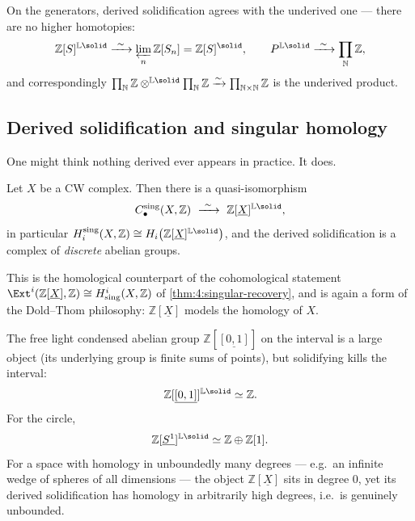 On the generators, derived solidification agrees with the underived one --- there
are no higher homotopies:
\begin{equation*}
\mathbb{Z}[S]^{\mathbb{L}\solid}\xrightarrow{\ \sim\ }\varprojlim_{n}\mathbb{Z}[S_{n}]
=\mathbb{Z}[S]^{\solid},\qquad
P^{\mathbb{L}\solid}\xrightarrow{\ \sim\ }\prod_{\mathbb{N}}\mathbb{Z},
\end{equation*}
and correspondingly
$\prod_{\mathbb{N}}\mathbb{Z}\otimes^{\mathbb{L}\solid}\prod_{\mathbb{N}}\mathbb{Z}
\xrightarrow{\sim}\prod_{\mathbb{N}\times\mathbb{N}}\mathbb{Z}$ is the underived
product.

\subsection{Derived solidification and singular homology}

One might think nothing derived ever appears in practice. It does.

\begin{proposition}
\label{prop:6:singular-homology}
Let $X$ be a CW complex. Then there is a quasi-isomorphism
\begin{equation*}
C^{\mathrm{sing}}_{\bullet}(X,\mathbb{Z})\ \xrightarrow{\ \sim\ }\ \mathbb{Z}[\underline{X}]^{\mathbb{L}\solid},
\end{equation*}
in particular
$H_{i}^{\mathrm{sing}}(X,\mathbb{Z})\cong H_{i}\bigl(\mathbb{Z}[\underline{X}]^{\mathbb{L}\solid}\bigr)$,
and the derived solidification is a complex of \emph{discrete} abelian groups.
\end{proposition}

This is the homological counterpart of the cohomological statement
$\Ext^{i}(\mathbb{Z}[\underline{X}],\mathbb{Z})\cong H^{i}_{\mathrm{sing}}(X,\mathbb{Z})$
of \cref{thm:4:singular-recovery}, and is again a form of the Dold--Thom
philosophy: $\mathbb{Z}[\underline{X}]$ models the homology of $X$.

\begin{example}
\label{ex:6:solid-of-spaces}
The free light condensed abelian group $\mathbb{Z}[\underline{[0,1]}]$ on the
interval is a large object (its underlying group is finite sums of points), but
solidifying kills the interval:
\begin{equation*}
\mathbb{Z}[\underline{[0,1]}]^{\mathbb{L}\solid}\simeq\mathbb{Z}.
\end{equation*}
For the circle,
\begin{equation*}
\mathbb{Z}[\underline{S^{1}}]^{\mathbb{L}\solid}\simeq\mathbb{Z}\oplus\mathbb{Z}[1].
\end{equation*}
For a space with homology in unboundedly many degrees --- e.g.\ an infinite
wedge of spheres of all dimensions --- the object $\mathbb{Z}[\underline{X}]$ sits
in degree $0$, yet its derived solidification has homology in arbitrarily high
degrees, i.e.\ is genuinely unbounded.
\end{example}

